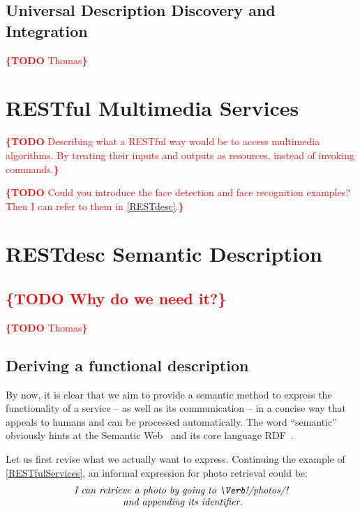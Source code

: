\documentclass[runningheads,a4paper, twocolumn]{llncs}
\newcommand{\todo}[1]{\noindent\textcolor{red}{{\bf \{TODO} #1{\bf \}}}}
\begin{document}
\subsection{Universal Description Discovery and Integration}
\todo{Thomas}

\section{RESTful Multimedia Services}
\label{RESTfulServices}
\todo{Describing what a RESTful way would be to access multimedia algorithms. By treating their inputs and outputs as resources, instead of invoking commands.}

\todo{Could you introduce the face detection and face recognition examples? Then I can refer to them in \autoref{RESTdesc}.}

\section{RESTdesc Semantic Description}
\label{RESTdesc}
\subsection{\todo{Why do we need it?}}
\todo{Thomas}

\subsection{Deriving a functional description}
By now, it is clear that we aim to provide a semantic method to express the functionality of a service -- as well as its communication -- in a concise way that appeals to humans and can be processed automatically. The word ``semantic'' obviously hints at the Semantic Web~\cite{SemanticWeb} and its core language RDF~\cite{RDF}.

Let us first revise what we actually want to express. Continuing the example of \autoref{RESTfulServices}, an informal expression for photo retrieval could be:
\begin{multline}\label{eq:Informal}
	\textit{I can retrieve a photo by going to \Verb!/photos/!}\\[-.3em]
	\textit{ and appending its identifier.}
\end{multline}
\end{document}
